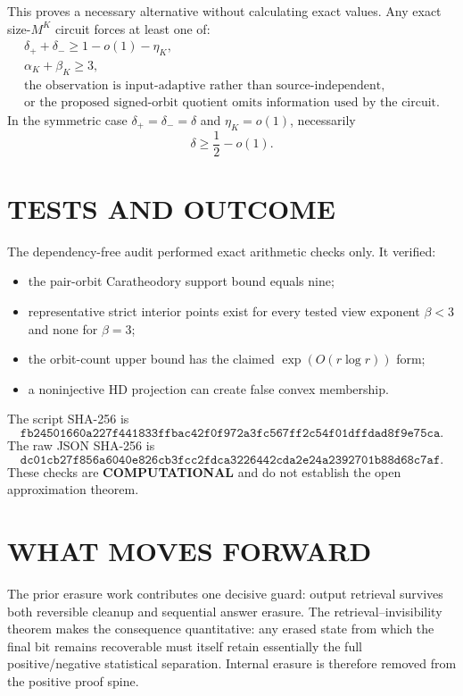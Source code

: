 \documentclass[11pt]{article}
\newcommand{\COMP}{\textbf{COMPUTATIONAL}}
\begin{document}
This proves a necessary alternative without calculating exact values. Any exact size-$M^K$ circuit forces at least one of:
\[
\boxed{
\begin{array}{l}
\delta_++\delta_-\ge1-o(1)-\eta_K,\\
\alpha_K+\beta_K\ge3,\\
\text{the observation is input-adaptive rather than source-independent},\\
\text{or the proposed signed-orbit quotient omits information used by the circuit.}
\end{array}}
\]
In the symmetric case $\delta_+=\delta_-=\delta$ and $\eta_K=o(1)$, necessarily
\[
\delta\ge\frac12-o(1).
\]

\section{TESTS AND OUTCOME}
The dependency-free audit  performed exact arithmetic checks only. It verified:
\begin{itemize}
\item[] the pair-orbit Caratheodory support bound equals nine;
\item[] representative strict interior points exist for every tested view exponent $\beta<3$ and none for $\beta=3$;
\item[] the orbit-count upper bound has the claimed $\exp(O(r\log r))$ form;
\item[] a noninjective HD projection can create false convex membership.
\end{itemize}
The script SHA-256 is
\[
\texttt{fb24501660a227f441833ffbac42f0f972a3fc567ff2c54f01dffdad8f9e75ca}.
\]
The raw JSON SHA-256 is
\[
\texttt{dc01cb27f856a6040e826cb3fcc2fdca3226442cda2e24a2392701b88d68c7af}.
\]
These checks are \COMP{} and do not establish the open approximation theorem.

\section{WHAT MOVES FORWARD}
The prior erasure work contributes one decisive guard: output retrieval survives both reversible cleanup and sequential answer erasure. The retrieval--invisibility theorem makes the consequence quantitative: any erased state from which the final bit remains recoverable must itself retain essentially the full positive/negative statistical separation. Internal erasure is therefore removed from the positive proof spine.
\end{document}
